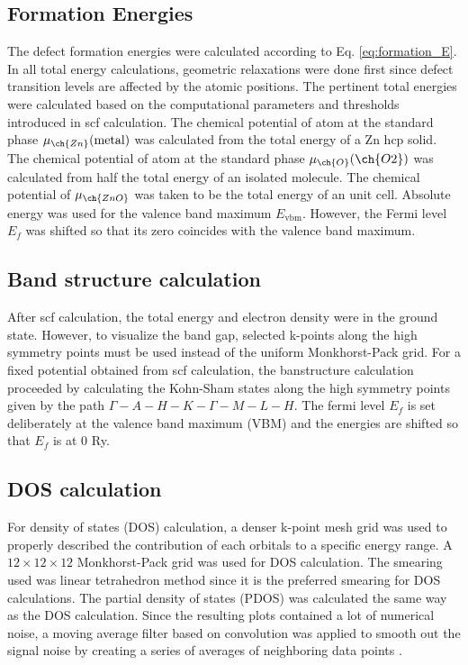 \subsection{Formation Energies}
The defect formation energies were calculated according to Eq. \eqref{eq:formation_E}. In all total energy calculations, geometric relaxations were done first since defect transition levels are affected by the atomic positions. The pertinent total energies were calculated based on the computational parameters and thresholds introduced in scf calculation. The chemical potential of  atom at the standard phase $\mu_{\ch{Zn}}(\text{metal})$ was calculated from the total energy of a Zn hcp solid. The chemical potential of  atom at the standard phase
$\mu_{\ch{O}}(\ch{O2})$ was calculated from  half the total energy of an isolated  molecule. The chemical potential of $\mu_{\ch{ZnO}}$ was taken to be the total energy of an unit cell. Absolute energy was used for the valence band maximum $E_{\text{vbm}}$. However, the Fermi level $E_f$ was shifted so that its zero coincides with the valence band maximum.

\subsection{Band structure calculation}
After scf calculation, the total energy and electron density were in the ground state. However, to visualize the band gap, selected k-points along the high symmetry points must be used instead of the uniform Monkhorst-Pack grid. For a fixed potential obtained from scf calculation, the banstructure calculation proceeded by calculating the Kohn-Sham states along the high symmetry points given by the path $\Gamma-A-H-K-\Gamma-M-L-H$. The fermi level $E_f$ is set deliberately at the valence band maximum (VBM) and the energies are shifted so that $E_f$ is at  0 Ry.

\subsection{DOS calculation}
For density of states (DOS) calculation, a denser k-point mesh grid was used to properly described the contribution of each orbitals to a  specific energy range. A $12 \times 12 \times 12$ Monkhorst-Pack grid was used for DOS calculation. The smearing used was linear tetrahedron method since it is the preferred smearing for DOS calculations. The partial density of states (PDOS) was calculated the same way as the  DOS calculation. Since the resulting plots contained a lot of numerical noise, a moving average filter based on convolution was applied to smooth out the signal noise by creating a series of averages of neighboring data points \citep{Smith2003,Guthrie2020}.
 

